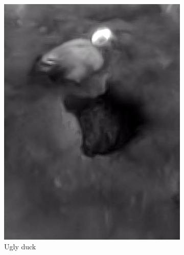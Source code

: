 \documentclass{l4proj}
\begin{document}
\begin{figure}[ht]
\begin{subfigure}[h!]{0.18\textwidth}
    \includegraphics[width=\textwidth, trim={0cm 2.5cm 0cm 2.5cm}, clip]{images/dataset/ugly_duck/lwir.png}
    \caption{Ugly duck}
  \end{subfigure}
  \begin{subfigure}[h!]{0.18\textwidth}

\end{subfigure}
\end{figure}
\end{document}

